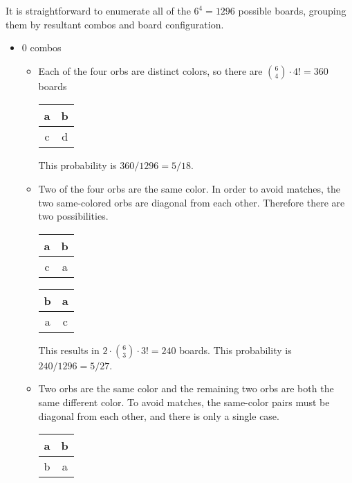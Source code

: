 \documentclass[12pt]{article}
\theoremstyle{definition}
\begin{document}
It is straightforward to enumerate all of the $6^4=1296$ possible boards, grouping them by resultant combos and board configuration.
\begin{itemize}
    \item 0 combos
    \begin{itemize}
        \item Each of the four orbs are distinct colors, so there are $\binom{6}{4}\cdot 4!=360$ boards
        \begin{center}
            \begin{tabular}{|c|c|}
            \hline
            a & b \\
            \hline
            c & d \\
            \hline
            \end{tabular}
        \end{center}
        This probability is $360/1296=5/18$.
        \item Two of the four orbs are the same color. In order to avoid matches, the two same-colored orbs are diagonal from each other. Therefore there are two possibilities.
        \begin{center}
            \begin{tabular}{|c|c|}
            \hline
            a & b \\
            \hline
            c & a \\
            \hline
            \end{tabular}
            \qquad
            \begin{tabular}{|c|c|}
            \hline
            b & a \\
            \hline
            a & c \\
            \hline
            \end{tabular}
        \end{center}
        This results in $2\cdot\binom{6}{3}\cdot 3!=240$ boards.
        This probability is $240/1296=5/27$.
        \item Two orbs are the same color and the remaining two orbs are both the same different color. To avoid matches, the same-color pairs must be diagonal from each other, and there is only a single case.
        \begin{center}
            \begin{tabular}{|c|c|}
            \hline
            a & b \\
            \hline
            b & a \\
            \hline

\end{tabular}
\end{center}
\end{itemize}
\end{itemize}
\end{document}
